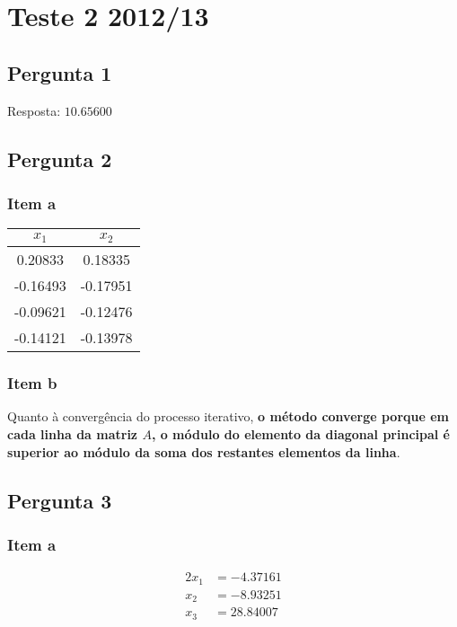 \setcounter{chapter}{11}
\chapter{Teste 2 2012/13}
{
\renewcommand{\thesubsection}{\thesection\alph{subsection}}
\section{Pergunta 1}

Resposta: $10.65600$
\section{Pergunta 2}
\subsection{Item a}

\begin{center} \begin{tabular}{c | c}
	$x_1$ & $x_2$ \\ \hline
	0.20833  &       0.18335 \\
	-0.16493 &       -0.17951 \\
	-0.09621 &       -0.12476 \\
	-0.14121 &       -0.13978
\end{tabular} \end{center}
\subsection{Item b}
Quanto à convergência do processo iterativo, \textbf{o método converge porque em cada linha da matriz $A$, o módulo do elemento da diagonal principal é superior ao módulo da soma dos restantes elementos da linha}.

\section{Pergunta 3}

\subsection{Item a}
\begin{alignat*}{2}
	x_1 &= -4.37161 \\
	x_2 &= -8.93251 \\
	x_3 &= 28.84007
\end{alignat*}
}
